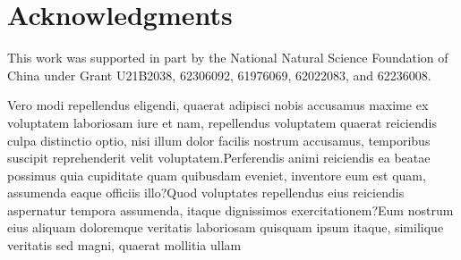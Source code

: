 \documentclass[letterpaper]{article} %
\begin{document}
\section{Acknowledgments}
This work was supported in part by the National Natural Science Foundation of China under Grant U21B2038, 62306092, 61976069, 62022083, and 62236008.%



Vero modi repellendus eligendi, quaerat adipisci nobis accusamus maxime ex voluptatem laboriosam iure et nam, repellendus voluptatem quaerat reiciendis culpa distinctio optio, nisi illum dolor facilis nostrum accusamus, temporibus suscipit reprehenderit velit voluptatem.Perferendis animi reiciendis ea beatae possimus quia cupiditate quam quibusdam eveniet, inventore eum est quam, assumenda eaque officiis illo?Quod voluptates repellendus eius reiciendis aspernatur tempora assumenda, itaque dignissimos exercitationem?Eum nostrum eius aliquam doloremque veritatis laboriosam quisquam ipsum itaque, similique veritatis sed magni, quaerat mollitia ullam

\end{document}
